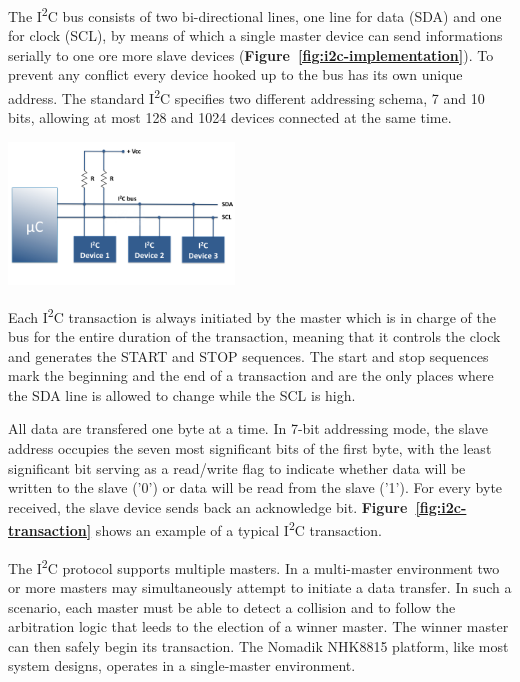 \documentclass[a4paper,10pt]{article}
\makeatletter
\newenvironment{figurehere}{\def\@captype{figure}\vspace{2ex}}{\vspace{2ex}}
\newcommand{\iic}{I\textsuperscript{2}C }
\newcommand{\reff}[1]{\textbf{Figure~\ref{#1}}}
\makeatother
\begin{document}
\begin{multicols}{2}
The \iic bus consists of two bi-directional lines, one line for data (SDA)
and one for clock (SCL), by means of which a single master device can send
informations serially to one ore more slave devices
(\reff{fig:i2c-implementation}).
To prevent any conflict every device hooked up to the bus has its own unique
address. The standard \iic specifies two different addressing schema, 7 and
10 bits, allowing at most 128 and 1024 devices connected at the same time.

\begin{figurehere}
 \centering
 \includegraphics[width=6cm]{./figures/i2c-diagram.png}
 \caption{Sample \iic implementation (adapted from \emph{embedded-lab.com}).}
 \label{fig:i2c-implementation}
\end{figurehere}

Each \iic transaction is always initiated by the master which is in charge of
the bus for the entire duration of the transaction, meaning that it controls the
clock and generates the START and STOP sequences. The start and stop sequences
mark the beginning and the end of a transaction and are the only places where
the SDA line is allowed to change while the SCL is high.

All data are transfered one byte at a time. In 7-bit addressing mode, the slave
address occupies the seven most significant bits of the first byte, with the
least significant bit serving as a read/write flag to indicate whether data
will be written to the slave ('0') or data will be read from the slave ('1').
For every byte received, the slave device sends back an acknowledge bit.
\reff{fig:i2c-transaction} shows an example of a typical \iic
transaction.

The \iic protocol supports multiple masters. In a multi-master environment two
or more masters may simultaneously attempt to initiate a data transfer.
In such a scenario, each master must be able to detect a collision and to follow
the arbitration logic that leeds to the election of a winner master. The winner
master can then safely begin its transaction.
The Nomadik NHK8815 platform, like most system designs, operates in a 
single-master environment.


\end{multicols}
\end{document}
